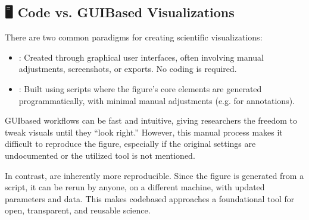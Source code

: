 \documentclass[letterpaper,10pt,english]{jupyterBook}
\begin{document}
\subsection{🖥️ Code\sphinxhyphen{} vs. GUI\sphinxhyphen{}Based Visualizations}
\label{\detokenize{chapters/03/03a_programmatic-visualizations:code-vs-gui-based-visualizations}}
\sphinxAtStartPar
There are two common paradigms for creating scientific visualizations:
\begin{itemize}
\item {} 
\sphinxAtStartPar
{}: Created through graphical user interfaces, often involving manual adjustments, screenshots, or exports. No coding is required.

\item {} 
\sphinxAtStartPar
{}: Built using scripts where the figure’s core elements are generated programmatically, with minimal manual adjustments (e.g. for annotations).

\end{itemize}

\sphinxAtStartPar
GUI\sphinxhyphen{}based workflows can be fast and intuitive, giving researchers the freedom to tweak visuals until they “look right.” However, this manual process makes it difficult to reproduce the figure, especially if the original settings are undocumented or the utilized tool is not mentioned.

\sphinxAtStartPar
In contrast,  are inherently more reproducible. Since the figure is generated from a script, it can be re\sphinxhyphen{}run by anyone, on a different machine, with updated parameters and data. This makes code\sphinxhyphen{}based approaches a foundational tool for open, transparent, and reusable science.
\end{document}
